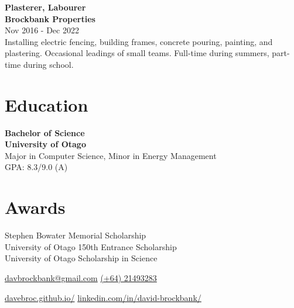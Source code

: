 \documentclass[lighthipster]{simplehipstercv}
\begin{document}
\begin{minipage}[t]{1\textwidth}
    \textbf{Plasterer, Labourer}\\
    \textbf{Brockbank Properties }\\
    Nov 2016 - Dec 2022 \\
    Installing electric fencing, building frames, concrete pouring, painting, and plastering. Occasional leadings of small teams. Full-time during summers, part-time during school.\\
      
    \end{minipage}    
    \bigskip
    
    \begin{minipage}[t]{1\textwidth}
    \section*{Education}
    
    \textbf{Bachelor of Science}\\
    \textbf{University of Otago}\\
    Major in Computer Science, Minor in Energy Management\\
    GPA: 8.3/9.0 (A)\\
    
    \end{minipage}
    \bigskip
    
    \begin{minipage}[t]{1\textwidth}
    \section*{Awards}
    Stephen Bowater Memorial Scholarship\\
    University of Otago 150th Entrance Scholarship\\
    University of Otago Scholarship in Science
    \bigskip
    \bigskip
    
    \end{minipage}\hfill
\setlength{\parindent}{0pt}

\begin{minipage}[t]{1\textwidth}
\fontfamily{\sfdefault}\selectfont \color{black!70}
{\begin{center}\small 
    \href{mailto:davbrockbank@gmail.com}{ davbrockbank@gmail.com}  
    \href{tel:021493283}{ (+64) 21493283}  
 \end{center}
\begin{center}
    \href{https://davebroc.github.io/}{davebroc.github.io/}
    \href{https://www.linkedin.com/in/david-brockbank/}{linkedin.com/in/david-brockbank/}
\end{center}
}
\end{minipage}
\end{document}
